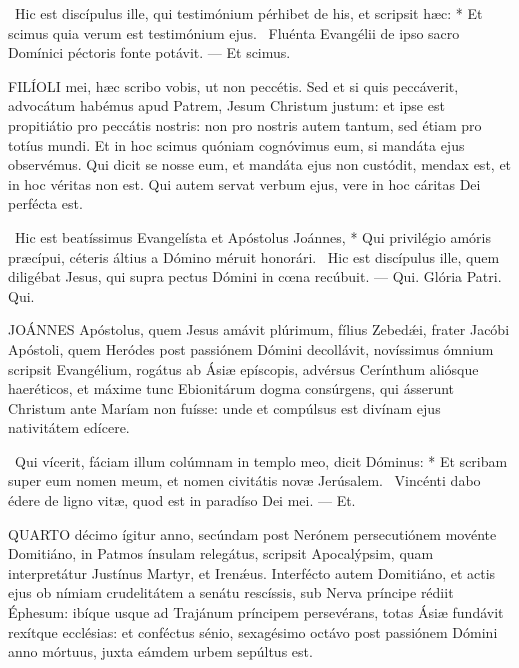 \R\ Hic est discípulus ille, qui testimónium pérhibet de his, et scripsit hæc: * Et scimus quia verum est testimónium ejus. \V\ Fluénta Evangélii de ipso sacro Domínici péctoris fonte potávit. --- Et scimus.


\lettrine[lines=2]{F}{ILÍOLI} mei, hæc scribo vobis, ut non peccétis. Sed et si quis peccáverit, advocátum habémus apud Patrem, Jesum Christum justum: et ipse est propitiátio pro peccátis nostris: non pro nostris autem tantum, sed étiam pro totíus mundi. Et in hoc scimus quóniam cognóvimus eum, si mandáta ejus observémus. Qui dicit se nosse eum, et mandáta ejus non custódit, mendax est, et in hoc véritas non est. Qui autem servat verbum ejus, vere in hoc cáritas Dei perfécta est.

\R\ Hic est beatíssimus Evangelísta et Apóstolus Joánnes, * Qui privilégio amóris præcípui, céteris áltius a Dómino méruit honorári. \V\ Hic est discípulus ille, quem diligébat Jesus, qui supra pectus Dómini in cœna recúbuit. --- Qui. Glória Patri. Qui.




\lettrine[lines=2]{J}{OÁNNES} Apóstolus, quem Jesus amávit plúrimum, fílius Zebedǽi, frater Jacóbi Apóstoli, quem Heródes post passiónem Dómini decollávit, novíssimus ómnium scripsit Evangélium, rogátus ab Ásiæ epíscopis, advérsus Cerínthum aliósque haeréticos, et máxime tunc Ebionitárum dogma consúrgens, qui ásserunt Christum ante Maríam non fuísse: unde et compúlsus est divínam ejus nativitátem edícere.

\R\ Qui vícerit, fáciam illum colúmnam in templo meo, dicit Dóminus: * Et scribam super eum nomen meum, et nomen civitátis novæ Jerúsalem. \V\ Vincénti dabo édere de ligno vitæ, quod est in paradíso Dei mei. --- Et.


\lettrine[lines=2]{Q}{UARTO} décimo ígitur anno, secúndam post Nerónem persecutiónem movénte Domitiáno, in Patmos ínsulam relegátus, scripsit Apocalýpsim, quam interpretátur Justínus Martyr, et Irenǽus. Interfécto autem Domitiáno, et actis ejus ob nímiam crudelitátem a senátu rescíssis, sub Nerva príncipe rédiit Éphesum: ibíque usque ad Trajánum príncipem persevérans, totas Ásiæ fundávit rexítque ecclésias: et conféctus sénio, sexagésimo octávo post passiónem Dómini anno mórtuus, juxta eámdem urbem sepúltus est.

